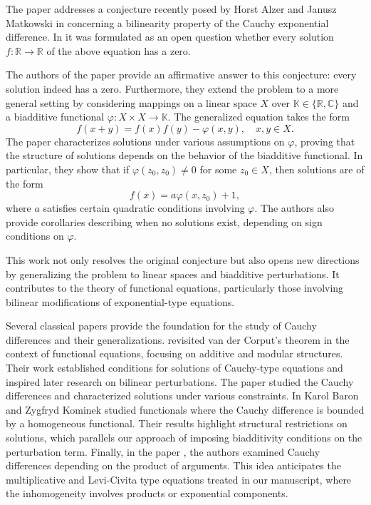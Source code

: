 \documentclass[a4paper,12pt]{article}
\theoremstyle{plain}
\theoremstyle{definition}
\theoremstyle{remark}
\begin{document}
The paper \cite{FecPieSme25} addresses a conjecture recently posed by Horst Alzer and Janusz Matkowski in \cite{AlzMat24} concerning a bilinearity property of the Cauchy exponential difference. In \cite{AlzMat24} it was formulated as an open question whether every solution \(f \colon \mathbb{R} \to \mathbb{R}\) of the above equation has a zero.

The authors of the paper \cite{FecPieSme25} provide an affirmative answer to this conjecture: every solution indeed has a zero. Furthermore, they extend the problem to a more general setting by considering mappings on a linear space \(X\) over \(\mathbb{K} \in \{\mathbb{R}, \mathbb{C}\}\) and a biadditive functional \(\varphi \colon  X \times X \to \mathbb{K}\). The generalized equation takes the form
\[
f(x+y) = f(x)f(y) - \varphi(x,y), \quad x,y \in X.
\]
The paper characterizes solutions under various assumptions on \(\varphi\), proving that the structure of solutions depends on the behavior of the biadditive functional. In particular, they show that if \(\varphi(z_0,z_0) \neq 0\) for some \(z_0 \in X\), then solutions are of the form
\[
f(x) = a \varphi(x,z_0) + 1,
\]
where \(a\) satisfies certain quadratic conditions involving \(\varphi\). The authors also provide corollaries describing when no solutions exist, depending on sign conditions on \(\varphi\).

This work not only resolves the original conjecture but also opens new directions by generalizing the problem to linear spaces and biadditive perturbations. It contributes to the theory of functional equations, particularly those involving bilinear modifications of exponential-type equations. 


Several classical papers provide the foundation for the study of Cauchy differences and their generalizations. \cite{BarVol91} revisited van der Corput’s theorem in the context of functional equations, focusing on additive and modular structures. Their work established conditions for solutions of Cauchy-type equations and inspired later research on bilinear perturbations.
The paper \cite{BarKan93} studied the Cauchy differences
and characterized solutions under various constraints. 
In \cite{BarKom03} Karol Baron and Zygfryd Kominek studied functionals where the Cauchy difference is bounded by a homogeneous functional. Their results highlight structural restrictions on solutions, which parallels our approach of imposing biadditivity conditions on the perturbation term.
Finally, in the paper \cite{EbaKanSah92}, the authors examined Cauchy differences depending on the product of arguments. This idea anticipates the multiplicative and Levi-Civita type equations treated in our manuscript, where the inhomogeneity involves products or exponential components.
\end{document}
